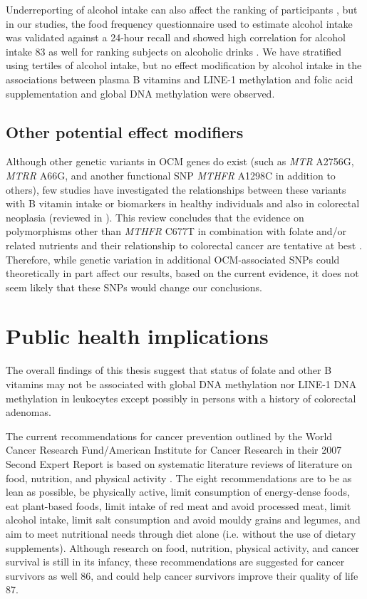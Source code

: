 \noindent Underreporting of alcohol intake can also affect the ranking of participants \cite{c782}, but in our studies, the food frequency questionnaire used to estimate alcohol intake was validated against a 24-hour recall and showed high correlation for alcohol intake 83 as well for ranking subjects on alcoholic drinks \cite{c784}. We have stratified using tertiles of alcohol intake, but no effect modification by alcohol intake in the associations between plasma B vitamins and LINE-1 methylation and folic acid supplementation and global DNA methylation were observed. 
 
\subsection{Other potential effect modifiers} %
Although other genetic variants in OCM genes do exist (such as \emph{MTR} A2756G, \emph{MTRR} A66G, and another functional SNP \emph{MTHFR} A1298C in addition to others), few studies have investigated the relationships between these variants with B vitamin intake or biomarkers in healthy individuals and also in colorectal neoplasia (reviewed in \cite{c785}). This review concludes that the evidence on polymorphisms other than \emph{MTHFR} C677T in combination with folate and/or related nutrients and their relationship to colorectal cancer are tentative at best \cite{c785}. Therefore, while genetic variation in additional OCM-associated SNPs could theoretically in part affect our results, based on the current evidence, it does not seem likely that these SNPs would change our conclusions. 
 
\section[]{Public health implications} %
The overall findings of this thesis suggest that status of folate and other B vitamins may not be associated with global  DNA methylation nor LINE-1 DNA methylation in leukocytes except possibly in persons with a history of colorectal adenomas. 
 
\noindent The current recommendations for cancer prevention outlined by the World Cancer Research Fund/American Institute for Cancer Research in their 2007 Second Expert Report is based on systematic literature reviews of literature on food, nutrition, and physical activity \cite{c786}. The eight recommendations are to be as lean as possible, be physically active, limit consumption of energy-dense foods, eat plant-based foods, limit intake of red meat and avoid processed meat, limit alcohol intake, limit salt consumption and avoid mouldy grains and legumes, and aim to meet nutritional needs through diet alone (i.e. without the use of dietary supplements). Although research on food, nutrition, physical activity, and cancer survival is still in its infancy, these recommendations are suggested for cancer survivors as well 86, and could help cancer survivors improve their quality of life 87. 
 
